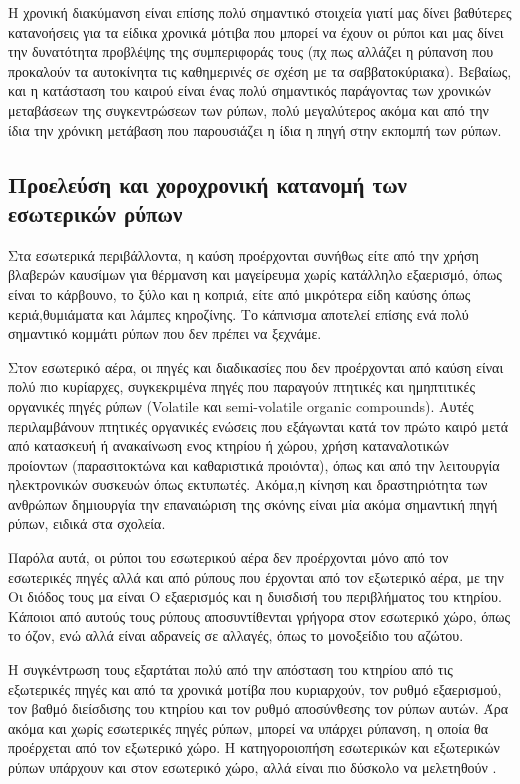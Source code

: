 Η χρονική διακύμανση είναι επίσης πολύ σημαντικό στοιχεία γιατί μας δίνει βαθύτερες κατανοήσεις για τα είδικα χρονικά μότιβα που μπορεί να έχουν οι ρύποι και μας δίνει την δυνατότητα προβλέψης της συμπεριφοράς τους (πχ πως αλλάζει η ρύπανση που προκαλούν τα αυτοκίνητα τις καθημερινές σε σχέση με τα σαββατοκύριακα). Βεβαίως, και η κατάσταση του καιρού είναι ένας πολύ σημαντικός παράγοντας των χρονικών μεταβάσεων της συγκεντρώσεων των ρύπων, πολύ μεγαλύτερος ακόμα και από την ίδια την χρόνικη μετάβαση που παρουσιάζει η ίδια η πηγή στην εκπομπή των ρύπων.


\subsection{Προελεύση και χοροχρονική κατανομή των εσωτερικών ρύπων}

Στα εσωτερικά περιβάλλοντα, η καύση προέρχονται συνήθως είτε από την  χρήση βλαβερών καυσίμων για θέρμανση και μαγείρευμα χωρίς κατάλληλο εξαερισμό, όπως είναι το κάρβουνο, το ξύλο και η κοπριά, είτε από μικρότερα είδη καύσης όπως κεριά,θυμιάματα και λάμπες κηροζίνης. Το κάπνισμα αποτελεί επίσης ενά πολύ σημαντικό κομμάτι ρύπων που δεν πρέπει να ξεχνάμε.

Στον εσωτερικό αέρα, οι πηγές και διαδικασίες που δεν προέρχονται από καύση είναι πολύ πιο κυρίαρχες, συγκεκριμένα πηγές που παραγούν πτητικές και ημηπτιτικές οργανικές πηγές ρύπων (Volatile και semi-volatile organic compounds). Αυτές περιλαμβάνουν πτητικές οργανικές ενώσεις που εξάγωνται κατά τον πρώτο καιρό μετά από κατασκευή ή ανακαίνωση ενος κτηρίου ή χώρου, χρήση καταναλοτικών προίοντων (παρασιτοκτώνα και καθαριστικά προιόντα), όπως και από την λειτουργία ηλεκτρονικών συσκευών όπως εκτυπωτές. Ακόμα,η κίνηση και δραστηριότητα των ανθρώπων δημιουργία την επαναιώριση της σκόνης είναι μία ακόμα σημαντική πηγή ρύπων, ειδικά στα σχολεία.

Παρόλα αυτά, οι ρύποι του εσωτερικού αέρα δεν προέρχονται μόνο από τον εσωτερικές πηγές αλλά και από ρύπους που έρχονται από τον εξωτερικό αέρα, με την Οι διόδος τους μα είναι Ο εξαερισμός και η δυισδισή του περιβλήματος του κτηρίου. Κάποιοι από αυτούς τους ρύπους αποσυντίθενται γρήγορα στον εσωτερικό χώρο, όπως το όζον, ενώ αλλά είναι αδρανείς σε αλλαγές, όπως το μονοξείδιο του αζώτου.

Η συγκέντρωση τους εξαρτάται πολύ από την απόσταση του κτηρίου από τις εξωτερικές πηγές και από τα χρονικά μοτίβα που κυριαρχούν, τον ρυθμό εξαερισμού, τον βαθμό διείσδισης του κτηρίου και τον ρυθμό αποσύνθεσης τον ρύπων αυτών.
Άρα ακόμα και χωρίς εσωτερικές πηγές ρύπων, μπορεί να υπάρχει ρύπανση, η οποία θα προέρχεται από τον εξωτερικό χώρο. Η κατηγοροιοπήση εσωτερικών και εξωτερικών ρύπων υπάρχουν και στον εσωτερικό χώρο, αλλά είναι πιο δύσκολο να μελετηθούν \cite{SARAGA2024117821}.


